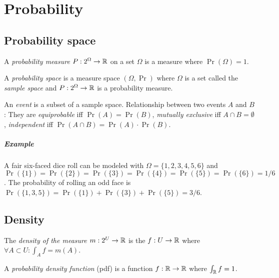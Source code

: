 \chapter{Probability}

\section{Probability space}

%
%
%
A \emph{probability measure} \(P : 2^\Omega \to \mathbb{R}\) on a set \(\Omega\) is a measure where \(\Pr(\Omega) = 1\).

%
%
%
A \emph{probability space} is a measure space \((\Omega,\Pr)\) where
\(\Omega\) is a set called the
%
%
%
\emph{sample space}
and \(P : 2^\Omega \to \mathbb{R}\) is a probability measure.

%
An \emph{event} is a subset of a sample space.
Relationship between two events \(A\) and \(B\):
They are
%
%
\emph{equiprobable} iff \(\Pr(A) = \Pr(B)\),
%
%
\emph{mutually exclusive} iff \(A \cap B = \emptyset\),
%
%
\emph{independent} iff \(\Pr(A \cap B) = \Pr(A) \cdot \Pr(B)\).

\paragraph{Example}
A fair six-faced dice roll can be modeled with
\(\Omega = \{1,2,3,4,5,6\}\) and \(\Pr(\{1\}) = \Pr(\{2\}) = \Pr(\{3\}) = \Pr(\{4\}) = \Pr(\{5\}) = \Pr(\{6\}) = 1/6\).
The probability of rolling an odd face is \(\Pr(\{1,3,5\}) = \Pr(\{1\}) + \Pr(\{3\}) + \Pr(\{5\}) = 3/6\).

\section{Density}

%
The \emph{density of the measure \(m : 2^U \to \mathbb{R}\)}
is the \(f : U \to \mathbb{R}\) where \(\forall A \subset U : \int_A f = m(A)\).

%
A \emph{probability density function} (pdf) is a function \(f : \mathbb{R} \to \mathbb{R}\) where \(\int_{\mathbb{R}} f = 1\).

